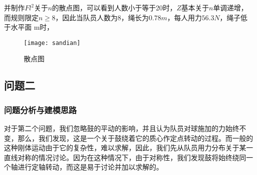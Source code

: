 \documentclass[withoutpreface,bwprint]{cumcmthesis} %
\begin{document}
并制作$Fl^{2}$关于$n$的散点图，可以看到人数小于等于20时，$Z$基本关于$n$单调递增，而规则限定$n\geq 8$，因此当队员人数为8，绳长为$0.78m$，每人用力$56.3N$，绳子低于水平面 m时，
\begin{figure}[!h]
    \centering
    \texttt{[image: sandian]}
    \caption{散点图}
    \label{fig:sandian}
\end{figure}




\subsection{问题二}
	\subsubsection{问题分析与建模思路}
对于第二个问题，我们忽略鼓的平动的影响，并且认为队员对球施加的力始终不变，那么，我们发现，这是一个关于鼓绕着它的质心作定点转动的过程。而一般的这种刚体运动由于它的复杂性，难以求解，因此，我们先从队员用力分布关于某一直线对称的情况讨论。因为在这种情况下，由于对称性，我们发现鼓将始终绕同一个轴进行定轴转动，而这是易于讨论并加以求解的。
\end{document}

